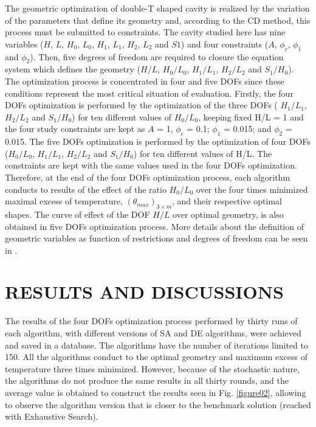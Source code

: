 \documentclass[12pt,fleqn]{article}
\begin{document}
The geometric optimization of double-T shaped cavity is realized by the variation of the parameters that define its geometry and, according to the CD method, this process must be submitted to constraints. The cavity studied here has nine variables ($H$, $L$, $H_{0}$, $L_{0}$, $H_{1}$, $L_{1}$, $H_{2}$, $L_{2}$ and $S1$) and four constraints ($A$, $\phi_{c}$, $\phi_{1}$ and $\phi_{2}$). Then, five degrees of freedom are required to closure the equation system which defines the geometry ($H/L$, $H_{0}/L_{0}$, $H_{1}/L_{1}$, $H_{2}/L_{2}$ and $S_{1}/H_{0}$). The optimization process is concentrated in four and five DOFs since these conditions represent the most critical situation of evaluation. Firstly, the four DOFs optimization is performed by the optimization of the three DOFs ( $H_{1}/L_{1}$, $H_{2}/L_{2}$ and $S_{1}/H_{0}$) for ten different values of $H_{0}/L_{0}$,  keeping fixed  H/L = 1 and the four study constraints are kept as $A$ = 1, $\phi_{c}$ = 0.1; $\phi_{1}$ = 0.015; and $\phi_{2}$ = 0.015. The five DOFs optimization is performed by the optimization of four DOFs ($H_{0}/L_{0}$, $H_{1}/L_{1}$, $H_{2}/L_{2}$ and $S_{1}/H_{0}$) for ten different values of H/L.  The constraints are kept with the same values used in the four  DOFs optimization. Therefore, at the end of the four  DOFs optimization process, each algorithm conducts to results of the effect of the ratio $H_{0}/L_{0}$ over the four times minimized maximal excess of temperature, $({\theta}_{max})_{3\times m}$, and their respective optimal shapes. The curve of effect of the DOF $H/L$ over optimal geometry, is also obtained in five DOFs optimization process. More details about the definition of geometric variables as function of restrictions and degrees of freedom can be seen in \cite{Gonzales2015b}.

\section{RESULTS AND DISCUSSIONS}

The results of the four DOFs optimization process performed by thirty runs of each algorithm, with different versions of SA and DE algorithms, were achieved and saved in a database. The algorithms have the number of iterations limited to 150. All the algorithms conduct to the optimal geometry and maximum excess of temperature three times minimized. However, because of the stochastic nature, the algorithms do not produce the same results in all thirty rounds, and the average value is obtained to construct the results seen in Fig. \ref{figure02}, allowing to observe the algorithm version that is closer to the benchmark solution (reached with Exhaustive Search).
\end{document}
